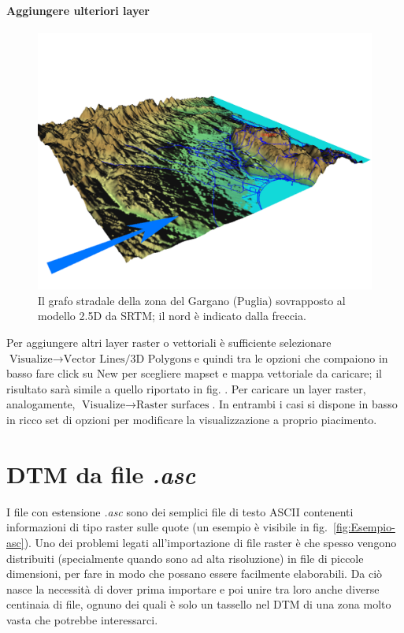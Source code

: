 			\paragraph{Aggiungere ulteriori layer}
				\begin{figure}
					\centering
					\includegraphics[scale=0.3]{img/prova}
					\caption{{\small Il grafo stradale della zona del Gargano (Puglia) sovrapposto al modello 2.5D da SRTM; il nord è indicato dalla freccia.}}
				\end{figure}
				
				Per aggiungere altri layer raster o vettoriali è sufficiente selezionare \textsf{$\text{Visualize}\rightarrow\text{Vector Lines/3D Polygons}$}e quindi tra le opzioni che compaiono in basso fare click su \textsf{New }per scegliere mapset e mappa vettoriale da caricare; il risultato sarà simile a quello riportato in fig. . Per caricare un layer raster, analogamente, \textsf{$\text{Visualize}\rightarrow\text{Raster surfaces}$}. In entrambi i casi si dispone in basso in ricco set di opzioni per modificare la visualizzazione a proprio piacimento.

\section{DTM da file \emph{.asc}}
	I file con estensione \emph{.asc} sono dei semplici file di testo ASCII contenenti informazioni di tipo raster sulle quote (un esempio è visibile in fig.~\ref{fig:Esempio-asc}). Uno dei problemi legati all'importazione di file raster è che spesso vengono distribuiti (specialmente quando sono ad alta risoluzione) in file di piccole dimensioni, per fare in modo che possano essere facilmente elaborabili. Da ciò nasce la necessità di dover prima importare e poi unire tra loro anche diverse centinaia di file, ognuno dei quali è solo un tassello nel DTM di una zona molto vasta che potrebbe interessarci.
	
